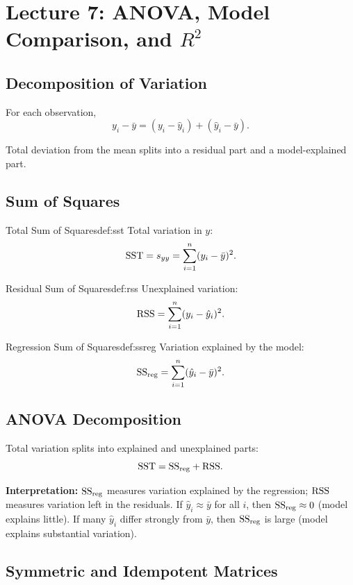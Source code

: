 \section{Lecture 7: ANOVA, Model Comparison, and $R^2$}

\subsection{Decomposition of Variation}

For each observation,
\[
y_i - \bar{y} = (y_i - \hat{y}_i) + (\hat{y}_i - \bar{y}).
\]

Total deviation from the mean splits into a residual part and a model-explained part.

\subsection{Sum of Squares}

\begin{defn}{Total Sum of Squares}{def:sst}
Total variation in $y$:
\[
\mathrm{SST} = s_{yy} = \sum_{i=1}^{n}(y_i-\bar{y})^2.
\]
\end{defn}

\begin{defn}{Residual Sum of Squares}{def:rss}
Unexplained variation:
\[
\mathrm{RSS}=\sum_{i=1}^{n}(y_i-\hat{y}_i)^2.
\]
\end{defn}

\begin{defn}{Regression Sum of Squares}{def:ssreg}
Variation explained by the model:
\[
\mathrm{SS}_{\mathrm{reg}}=\sum_{i=1}^{n}(\hat{y}_i-\bar{y})^2.
\]
\end{defn}

\subsection{ANOVA Decomposition}

Total variation splits into explained and unexplained parts:
\[
\mathrm{SST} = \mathrm{SS}_{\mathrm{reg}} + \mathrm{RSS}.
\]

\textbf{Interpretation:} $\mathrm{SS}_{\mathrm{reg}}$ measures variation explained by the regression; $\mathrm{RSS}$ measures variation left in the residuals. If $\hat{y}_i \approx \bar{y}$ for all $i$, then $\mathrm{SS}_{\mathrm{reg}} \approx 0$ (model explains little). If many $\hat{y}_i$ differ strongly from $\bar{y}$, then $\mathrm{SS}_{\mathrm{reg}}$ is large (model explains substantial variation).

\subsection{Symmetric and Idempotent Matrices}

